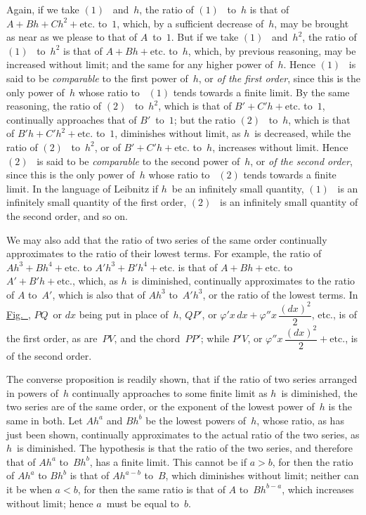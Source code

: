 \documentclass[12pt]{book}[2005/09/16]
\newcounter{SecNo}
\newcommand{\Fig}[2][Fig.]{\hyperref[fig:#2]{#1~{\upshape #2}}}
\newcommand{\Pagelabel}[1]{\phantomsection\label{page:#1}}
\newcommand{\PageSep}[1]{\Pagelabel{#1}\ignorespaces}
\renewcommand{\etc}{\text{etc}}
\renewcommand{\(}{{\upshape(}}
\renewcommand{\)}{{\upshape)}}
\renewcommand{\phi}{\varphi}
\newcommand{\Eq}[2][\theSecNo]{%
  \hyperref[eqn:#1.#2]{\ensuremath{#2}}%
}
\begin{document}
Again, if we take \Eq{(1)}~and~$h$, the ratio of \Eq{(1)}~to~$h$ is
that of $A + Bh + Ch^{2} + \etc.$ to~$1$, which, by a sufficient
decrease of~$h$, may be brought as near as we
please to that of $A$~to~$1$. But if we take \Eq{(1)}~and~$h^{2}$,
the ratio of \Eq{(1)}~to~$h^{2}$ is that of $A + Bh + \etc.$ to~$h$,
which, by previous reasoning, may be increased without
limit; and the same for any higher power of~$h$.
Hence \Eq{(1)}~is said to be \emph{comparable} to the first power
of~$h$, or \emph{of the first order}, since this is the only power
of~$h$ whose ratio to~\Eq{(1)} tends towards a finite limit.
By the same reasoning, the ratio of \Eq{(2)}~to~$h^{2}$, which is
that of $B' + C'h + \etc.$ to~$1$, continually approaches
that of $B'$~to~$1$; but the ratio \Eq{(2)}~to~$h$, which is that
of $B'h + C'h^{2} + \etc.$ to~$1$, diminishes without limit, as
$h$~is decreased, while the ratio of \Eq{(2)}~to~$h^{2}$, or of $B' + C'h + \etc.$
to~$h$, increases without limit. Hence \Eq{(2)}~is
said to be \emph{comparable} to the second power of~$h$, or \emph{of
the second order}, since this is the only power of~$h$ whose
ratio to~\Eq{(2)} tends towards a finite limit. In the language
of Leibnitz if $h$~be an infinitely small quantity,
\Eq{(1)}~is an infinitely small quantity of the first order,
\Eq{(2)}~is an infinitely small quantity of the second
order, and so on.

We may also add that the ratio of two series of
the same order continually approximates to the ratio
\PageSep{44}
of their lowest terms. For example, the ratio of $Ah^{3} + Bh^{4} + \etc.$
to $A'h^{3} + B'h^{4} + \etc.$ is that of $A + Bh + \etc.$
to $A' + B'h + \etc.$, which, as $h$~is diminished,
continually approximates to the ratio of $A$ to~$A'$, which
is also that of $Ah^{3}$ to~$A'h^{3}$, or the ratio of the lowest
terms. In \Fig{4}, $PQ$~or $dx$ being put in place of~$h$,
$QP'$, or $\phi' x\, dx + \phi'' x\, \dfrac{(dx)^{2}}{2}$, etc., is of the first order,
as are~$PV$, and the chord~$PP'$; while $P'V$, or
$\phi'' x\, \dfrac{(dx)^{2}}{2} + \etc.$, is of the second order.

The converse proposition is readily shown, that if
the ratio of two series arranged in powers of~$h$ continually
approaches to some finite limit as $h$~is diminished,
the two series are of the same order, or the exponent
of the lowest power of~$h$ is the same in both.
Let $Ah^{a}$ and $Bh^{b}$ be the lowest powers of~$h$, whose ratio,
as has just been shown, continually approximates
to the actual ratio of the two series, as $h$~is diminished.
The hypothesis is that the ratio of the two series, and
therefore that of $Ah^{a}$ to~$Bh^{b}$, has a finite limit. This
cannot be if $a > b$, for then the ratio of $Ah^{a}$ to $Bh^{b}$ is
that of $Ah^{a-b}$ to~$B$, which diminishes without limit;
neither can it be when $a < b$, for then the same ratio
is that of $A$ to~$Bh^{b-a}$, which increases without limit;
hence $a$~must be equal to~$b$.
\end{document}
